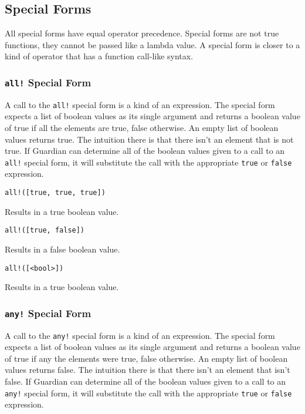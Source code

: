 
\subsection{Special Forms}
{
	All special forms have equal operator precedence.
	Special forms are not true functions, they
	cannot be passed like a lambda
	value. A special form is closer to a kind of operator
	that has a function call-like
	syntax.
	
	\subsubsection{\lstinline[language=MAIA, columns=fixed]@all!@ Special Form}
	{
		A call to the \lstinline[language=MAIA, columns=fixed]@all!@ special form is a kind of an expression.
		The special form expects a list of boolean values as its
		single argument and returns a boolean value of true if all the elements
		are true, false otherwise. An empty list of boolean values returns true.
		The intuition there is that there isn't an element that is not true.
		If Guardian can determine all of the boolean values given to a call to an
		\lstinline[language=MAIA, columns=fixed]@all!@ special form, it will
		substitute the call with the
		appropriate \lstinline[language=MAIA, columns=fixed]@true@ or
		\lstinline[language=MAIA, columns=fixed]@false@ expression.
		
		\begin{itemize}
		{
			\item[] \lstinline[language=MAIA, columns=fixed]@all!([true, true, true])@
			
				Results in a true boolean value.
			
			\item[] \lstinline[language=MAIA, columns=fixed]@all!([true, false])@
			
				Results in a false boolean value.
			
			\item[] \lstinline[language=MAIA, columns=fixed]@all!([<bool>])@
			
				Results in a true boolean value.
		}
		\end{itemize}
	}
	
	\subsubsection{\lstinline[language=MAIA, columns=fixed]@any!@ Special Form}
	{
		A call to the \lstinline[language=MAIA, columns=fixed]@any!@ special form is a kind of an expression.
		The special form expects a list of boolean values as its
		single argument and returns a boolean value of true if any the elements
		were true, false otherwise. An empty list of boolean values returns false.
		The intuition there is that there isn't an element that isn't false.
		If Guardian can determine all of the boolean values given to a call to an
		\lstinline[language=MAIA, columns=fixed]@any!@ special form, it will substitute the call with the
		appropriate \lstinline[language=MAIA, columns=fixed]@true@ or \lstinline[language=MAIA, columns=fixed]@false@ expression.
		
}}
